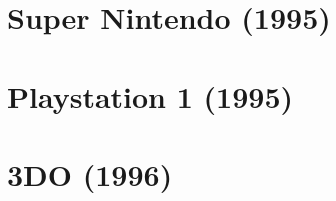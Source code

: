 \section{Super Nintendo (1995)}









\section{Playstation 1 (1995)}











\section{3DO (1996)}





